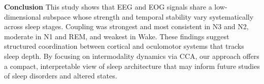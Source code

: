 \textbf{Conclusion}
This study shows that EEG and EOG signals share a low-dimensional subspace whose strength and temporal stability vary systematically across sleep stages. Coupling was strongest and most consistent in N3 and N2, moderate in N1 and REM, and weakest in Wake. These findings suggest structured coordination between cortical and oculomotor systems that tracks sleep depth. By focusing on intermodality dynamics via CCA, our approach offers a compact, interpretable view of sleep architecture that may inform future studies of sleep disorders and altered states.

\renewcommand{\baselinestretch}{1.5}
\cleardoublepage    %



